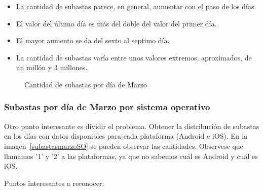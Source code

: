 \documentclass[a4paper, 12pt]{article}
\begin{document}
	\begin{itemize}
		\item La cantidad de subastas parece, en general, aumentar con el paso de los días.
		\item El valor del último día es más del doble del valor del primer día.
		\item El mayor aumento se da del sexto al septimo día.
		\item La cantidad de subastas varía entre unos valores extremos, aproximados, de un millón y 3 millones.
	\end{itemize}

		\begin{figure}[H]
			\centering
		   		\caption{Cantidad de subastas por día de Marzo}
			   	\label{subastasmarzo}
		\end{figure}

	\subsubsection{Subastas por día de Marzo por sistema operativo}
	 Otro punto interesante es dividir el problema. Obtener la distribución de subastas en los días con datos disponibles para cada plataforma (Android e iOS). En la imagen~\ref{subastasmarzoSO} se pueden observar las cantidades. Observese que llamamos '1' y '2' a las plataformas, ya que no sabemos cuál es Android y cuál es iOS.

	 Puntos interesantes a reconocer:
\end{document}
